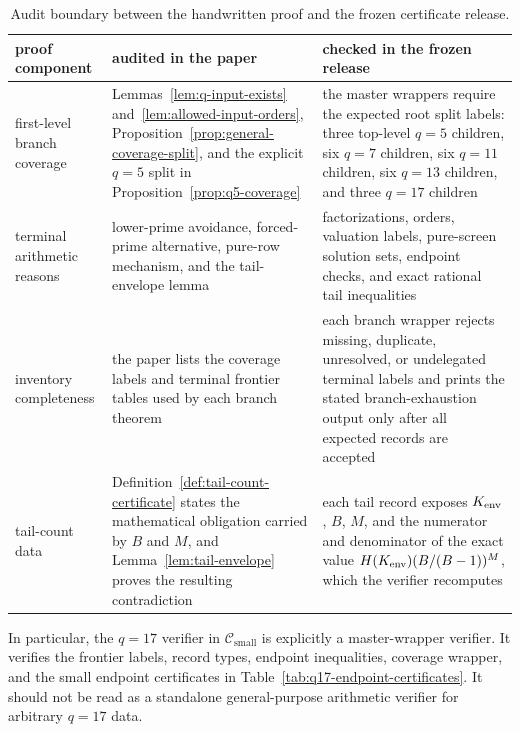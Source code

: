 \documentclass[11pt]{article}
\theoremstyle{definition}
\theoremstyle{remark}
\newcommand{\Hfun}{H}
\newcommand{\Csmall}{\ensuremath{\mathcal C_{\mathrm{small}}}}
\begin{document}
\begin{table}[ht]
\centering
\small
\begin{tabularx}{\textwidth}{>{\raggedright\arraybackslash}p{}|
  >{\raggedright\arraybackslash}X|
  >{\raggedright\arraybackslash}X}
\toprule
proof component & audited in the paper & checked in the frozen release\\
\midrule
first-level branch coverage &
Lemmas~\ref{lem:q-input-exists} and~\ref{lem:allowed-input-orders},
Proposition~\ref{prop:general-coverage-split}, and the explicit
\(q=5\) split in Proposition~\ref{prop:q5-coverage} &
the master wrappers require the expected root split labels:
three top-level \(q=5\) children, six \(q=7\) children, six \(q=11\) children,
six \(q=13\) children, and three \(q=17\) children\\
\midrule
terminal arithmetic reasons &
lower-prime avoidance, forced-prime alternative, pure-row mechanism, and the
tail-envelope lemma &
factorizations, orders, valuation labels, pure-screen solution sets, endpoint
checks, and exact rational tail inequalities\\
\midrule
inventory completeness &
the paper lists the coverage labels and terminal frontier tables used by each
branch theorem &
each branch wrapper rejects missing, duplicate, unresolved, or undelegated
terminal labels and prints the stated branch-exhaustion output only after all
expected records are accepted\\
\midrule
tail-count data &
Definition~\ref{def:tail-count-certificate} states the mathematical obligation
carried by \(B\) and \(M\), and Lemma~\ref{lem:tail-envelope} proves the
resulting contradiction &
each tail record exposes \(K_{\rm env}\), \(B\), \(M\), and the numerator and
denominator of the exact value
\(\Hfun(K_{\rm env})(B/(B-1))^M\), which the verifier recomputes\\
\bottomrule
\end{tabularx}
\caption{Audit boundary between the handwritten proof and the frozen
certificate release.}
\label{tab:audit-boundary}
\end{table}

In particular, the \(q=17\) verifier in \(\Csmall\) is explicitly a
master-wrapper verifier.  It verifies the frontier labels, record types,
endpoint inequalities, coverage wrapper, and the small endpoint certificates in
Table~\ref{tab:q17-endpoint-certificates}.  It should not be read as a
standalone general-purpose arithmetic verifier for arbitrary \(q=17\) data.
\end{document}
